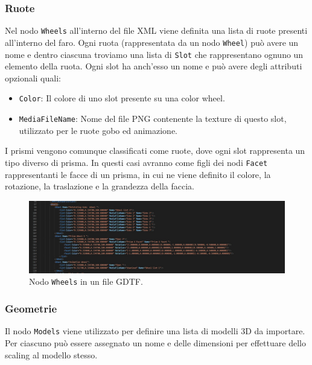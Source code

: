 \documentclass[main.tex]{subfiles}
\begin{document}
\subsubsection{Ruote}\label{subsec:1_2_wheels}
Nel nodo \lstinline{Wheels} all'interno del file XML viene definita una lista di ruote presenti all'interno del faro. Ogni ruota (rappresentata da un nodo \lstinline{Wheel}) può avere un nome e dentro ciascuna troviamo una lista di \lstinline{Slot} che rappresentano ognuno un elemento della ruota. Ogni slot ha anch'esso un nome e può avere degli attributi opzionali quali:
\begin{itemize}
    \item \lstinline{Color}: Il colore di uno slot presente su una color wheel.
    \item \lstinline{MediaFileName}: Nome del file PNG contenente la texture di questo slot, utilizzato per le ruote gobo ed animazione.
\end{itemize}
I prismi vengono comunque classificati come ruote, dove ogni slot rappresenta un tipo diverso di prisma. In questi casi avranno come figli dei nodi \lstinline{Facet} rappresentanti le facce di un prisma, in cui ne viene definito il colore, la rotazione, la traslazione e la grandezza della faccia.
\begin{figure}[H]
    \centering
    \includegraphics[width=1\linewidth]{img/introduzione/GDTFwheelExample.jpg}
    \caption{Nodo \lstinline{Wheels} in un file GDTF.}
    \label{fig:1_gdtfWheelExample}
\end{figure}

\subsubsection{Geometrie}\label{subsec:1_2_geometries}
Il nodo \lstinline{Models} viene utilizzato per definire una lista di modelli 3D da importare. Per ciascuno può essere assegnato un nome e delle dimensioni per effettuare dello scaling al modello stesso. 
\end{document}
